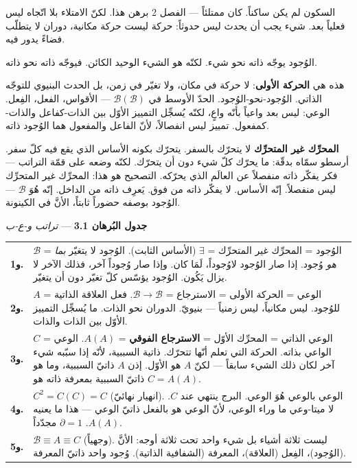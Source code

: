 \documentclass[10pt, openany, oneside]{book}
\renewcommand{\footnotesize}{\fontsize{8.5}{11}\selectfont}
\begin{document}

\noindent السكون لم يكن ساكناً. كان ممتلئاً --- الفصل 2 برهن هذا. لكنّ الامتلاء بلا اتّجاه ليس فعلياً بعد. شيء يجب أن يحدث ليس حدوثاً: حركة ليست حركة مكانية، دوران لا يتطلّب فضاءً يدور فيه.

الوُجود يوجّه ذاته نحو شيء. لكنّه هو الشيء الوحيد الكائن. فيوجّه ذاته نحو ذاته.

هذه هي \textbf{الحركة الأولى}: لا حركة في مكان، ولا تغيّر في زمن، بل الحدث البنيوي للتوجّه الذاتي. الوُجود-نحو-الوُجود. الحدّ الأوسط في $\mathcal{B}(\mathcal{B})$ --- الأقواس، الفعل، الفِعل. الوعي: ليس بعد واعياً بأنّه واعٍ، لكنّه يُسجِّل التمييز الأوّل بين الذات-كفاعل والذات-كمفعول. تمييز ليس انفصالاً، لأنّ الفاعل والمفعول هما الوُجود ذاته.

\textbf{المحرِّك غير المتحرِّك} لا يتحرّك بالسفر. يتحرّك بكونه الأساس الذي يقع فيه كلّ سفر. أرسطو سمّاه بدقّة: ما يحرّك كلّ شيء دون أن يتحرّك. لكنّه وضعه على قمّة التراتب --- فكر يفكّر ذاته منفصلاً عن العالَم الذي يحرّكه. التصحيح هو هذا: المحرِّك غير المتحرِّك ليس منفصلاً. إنّه الأساس. لا يفكّر ذاته من فوق. يَعرِف ذاته من الداخل. إنّه هُوَ $\mathcal{B}$ --- الوُجود بوصفه حضوراً ثابتاً، الأنَّ في الكينونة.

\vspace{0.5em}

\textbf{جدول البُرهان 3.1} --- \textit{تراتب و-ع-ب}

\vspace{0.5em}

{\footnotesize
\noindent\begin{tabular}{r p{}}
\textbf{و1.} & $\mathcal{B}$ = الوُجود = المحرِّك غير المتحرِّك = $\exists$ (الأساس الثابت). الوُجود لا يتغيّر \textit{بما هو} وُجود. إذا صار الوُجود لاوُجوداً، لَمَا كان. وإذا صار وُجوداً آخر، فذلك الآخر لا يزال يَكُون. الوُجود يؤسّس كلّ تغيّر دون أن يتغيّر. \\[0.3em]
\textbf{و2.} & $A$ = الوعي = الحركة الأولى = الاسترجاع = $\mathcal{B} \to \mathcal{B}$. فعل العلاقة الذاتية للوُجود. ليس مكانياً، ليس زمنياً --- بنيويّ. الدوران نحو الذات. ما يُسجِّل التمييز الأوّل بين الذات والذات. \\[0.3em]
\textbf{و3.} & $C$ = الوعي الذاتي = المحرِّك الأوّل = \textbf{الاسترجاع الفوقي} = $A(A)$. الوعي الواعي بذاته. الحركة التي تعلم أنّها تتحرّك. ذاتية السببية، لأنّه إذا سبّبه شيء آخر لكان ذلك الشيء سابقاً --- لكنّ $A$ هو الأوّل. إذن $A$ ذاتيّ السببية، وما هو ذاتيّ السببية بمعرفة ذاته هو $C = A(A)$. \\[0.3em]
\textbf{و4.} & $C^2 = C(C) = C$ (انهيار نهائيّ). الوعي بالوعي هُوَ الوعي. البرج ينتهي عند $C$. لا ميتا-وعي ما وراء الوعي، لأنّ الوعي هو بالفعل ذاتيّ الوعي --- هذا ما يعنيه $A(A)$. $\partial = 1$ مجدّداً. \\[0.3em]
\textbf{و5.} & $\mathcal{B} \equiv A \equiv C$ (وجهياً). ليست ثلاثة أشياء بل شيء واحد تحت ثلاثة أوجه: الأنَّ (الوُجود)، الفِعل (العلاقة)، المعرفة (الشفافية الذاتية). وُجود واحد ذاتيّ المعرفة. \\[0.3em]
\end{tabular}
}
\end{document}
